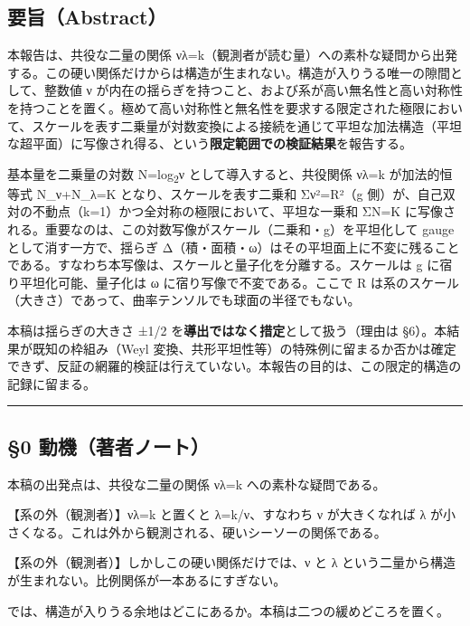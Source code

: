 \documentclass[11pt]{ltjsarticle}
\begin{document}
\subsection{要旨（Abstract）}\label{ux8981ux65e8abstract}

本報告は、共役な二量の関係
νλ=k（観測者が読む量）への素朴な疑問から出発する。この硬い関係だけからは構造が生まれない。構造が入りうる唯一の隙間として、整数値
ν
が内在の揺らぎを持つこと、および系が高い無名性と高い対称性を持つことを置く。極めて高い対称性と無名性を要求する限定された極限において、スケールを表す二乗量が対数変換による接続を通じて平坦な加法構造（平坦な超平面）に写像され得る、という\textbf{限定範囲での検証結果}を報告する。

基本量を二乗量の対数 N=log\textsubscript{2}ν として導入すると、共役関係 νλ=k
が加法的恒等式 N\_ν+N\_λ=K となり、スケールを表す二乗和 Σν²=R²（g
側）が、自己双対の不動点（k=1）かつ全対称の極限において、平坦な一乗和
ΣN=K
に写像される。重要なのは、この対数写像がスケール（二乗和・g）を平坦化して
gauge として消す一方で、揺らぎ
Δ（積・面積・ω）はその平坦面上に不変に残ることである。すなわち本写像は、スケールと量子化を分離する。スケールは
g に宿り平坦化可能、量子化は ω に宿り写像で不変である。ここで R
は系のスケール（大きさ）であって、曲率テンソルでも球面の半径でもない。

本稿は揺らぎの大きさ ±1/2 を\textbf{導出ではなく措定}として扱う（理由は
§6）。本結果が既知の枠組み（Weyl
変換、共形平坦性等）の特殊例に留まるか否かは確定できず、反証の網羅的検証は行えていない。本報告の目的は、この限定的構造の記録に留まる。

\begin{center}\rule{0.5\linewidth}{0.5pt}\end{center}

\subsection{§0
動機（著者ノート）}\label{ux52d5ux6a5fux8457ux8005ux30ceux30fcux30c8}

本稿の出発点は、共役な二量の関係 νλ=k への素朴な疑問である。

【系の外（観測者）】νλ=k と置くと λ=k/ν、すなわち ν が大きくなれば λ
が小さくなる。これは外から観測される、硬いシーソーの関係である。

【系の外（観測者）】しかしこの硬い関係だけでは、ν と λ
という二量から構造が生まれない。比例関係が一本あるにすぎない。

では、構造が入りうる余地はどこにあるか。本稿は二つの緩めどころを置く。
\end{document}

